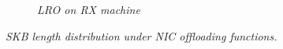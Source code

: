 \begin{figure}[t]
\begin{minipage}[t]{0.48\textwidth}
\begin{subfigure}[t]{.49\linewidth}
  \vspace{-6mm}
		\caption{\small{\textit{LRO on RX machine}}}
            \label{fig:packets-core}
	\end{subfigure}
    \vspace{-2mm}
	\caption{\small{
        \textit{SKB length distribution under NIC offloading functions. }
		}}
	\label{fig:packets}
 \end{minipage}
  \vspace{-0.1cm}
\end{figure}



